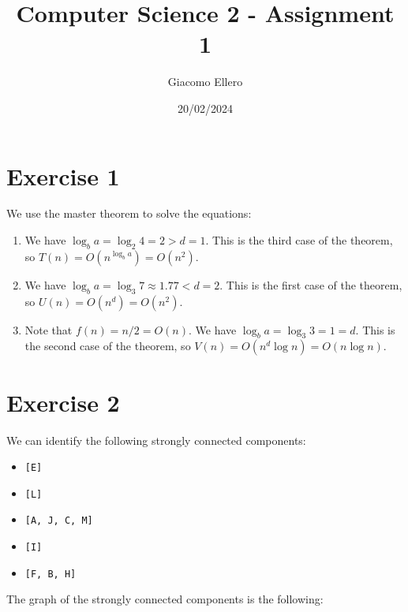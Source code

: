 \documentclass[10pt]{article}
\title{Computer Science 2 - Assignment 1}
\author{Giacomo Ellero}
\date{20/02/2024}
\begin{document}

\section*{Exercise 1}

We use the master theorem to solve the equations:

\begin{enumerate}
    \item We have $\log_b a = \log_2 4 = 2 > d = 1$. This is the third case of the theorem, so $T(n) = O(n^{\log_b a}) = O(n^2)$.
    \item We have $\log_b a = \log_3 7 \approx 1.77 < d = 2$. This is the first case of the theorem, so $U(n) = O(n^d) = O(n^2)$.
    \item Note that $f(n) = n/2 = O(n)$. We have $\log_b a = \log_3 3 = 1 = d$. This is the second case of the theorem, so $V(n) = O(n^d \log n) = O(n \log n)$.
\end{enumerate}

\section*{Exercise 2}

We can identify the following strongly connected components:
\begin{itemize}
    \item \texttt{[E]}
    \item \texttt{[L]}
    \item \texttt{[A, J, C, M]}
    \item \texttt{[I]}
    \item \texttt{[F, B, H]}
\end{itemize}

The graph of the strongly connected components is the following:

\begin{center}
\end{center}
\end{document}
